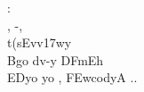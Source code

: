 \def\DevnagVersion{2.15}\documentclass{article}
\begin{document}
  \centering
  {\dn :}\\
  {\dn {}\0,} {\dn -,}\\
  {\dn t(sEvv\0\317wy{\rdt}}\\
  {\dn Bgo{\qvb}} {\dn d\?v-y} {\dn DFmEh}\\
  {\dn EDyo} {\dn yo} {\dn {},} {\dn \3FEwcodyA} {\dn ..}
\end{document}
